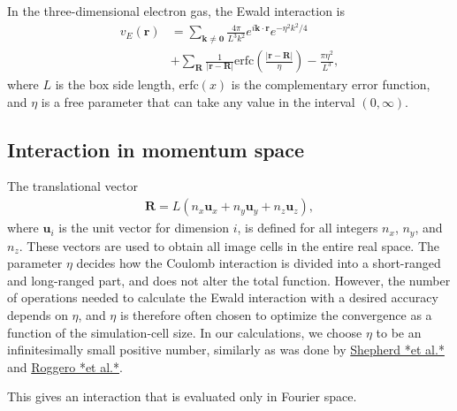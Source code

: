 \documentclass[%
oneside,                 %
final,                   %
10pt]{article}
\begin{document}
In the three-dimensional electron gas, the Ewald 
interaction is 
\begin{align}
  v_{E}(\mathbf{r}) &= \sum_{\mathbf{k} \neq \mathbf{0}}
  \frac{4\pi }{L^{3}k^{2}}e^{i\mathbf{k}\cdot \mathbf{r}}
  e^{-\eta^{2}k^{2}/4} \nonumber \\
  &+ \sum_{\mathbf{R}}\frac{1}{\left| \mathbf{r}
    -\mathbf{R}\right| } \mathrm{erfc} \left( \frac{\left| 
    \mathbf{r}-\mathbf{R}\right|}{\eta }\right)
  - \frac{\pi \eta^{2}}{L^{3}},
\end{align}
where $L$ is the box side length, $\mathrm{erfc}(x)$ is the 
complementary error function, and $\eta $ is a free
parameter that can take any value in the interval 
$(0, \infty )$.



\subsection{Interaction in momentum space}

The translational vector 
\begin{align}
  \mathbf{R} = L\left(n_{x}\mathbf{u}_{x} + n_{y}
  \mathbf{u}_{y} + n_{z}\mathbf{u}_{z}\right) ,
\end{align}
where $\mathbf{u}_{i}$ is the unit vector for dimension $i$,
is defined for all integers $n_{x}$, $n_{y}$, and 
$n_{z}$. These vectors are used to obtain all image
cells in the entire real space. 
The parameter $\eta $ decides how 
the Coulomb interaction is divided into a short-ranged
and long-ranged part, and does not alter the total
function. However, the number of operations needed
to calculate the Ewald interaction with a desired 
accuracy depends on $\eta $, and $\eta $ is therefore 
often chosen to optimize the convergence as a function
of the simulation-cell size. In
our calculations, we choose $\eta $ to be an infinitesimally
small positive number, similarly as was done by \href{{https://journals.aps.org/prb/abstract/10.1103/PhysRevB.86.035111}}{Shepherd *et al.*} and \href{{https://journals.aps.org/prb/abstract/10.1103/PhysRevB.88.115138}}{Roggero *et al.*}.

This gives an interaction that is evaluated only in
Fourier space. 
\end{document}

